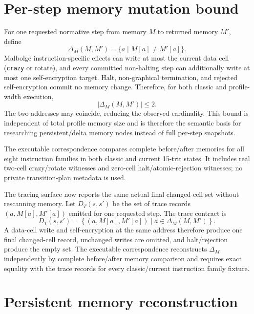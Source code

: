 \documentclass{article}
\begin{document}
\section{Per-step memory mutation bound}

For one requested normative step from memory $M$ to returned memory $M'$, define
\[
  \Delta_M(M,M')=\{a\mid M[a]\neq M'[a]\}.
\]
Malbolge instruction-specific effects can write at most the current data cell
(\texttt{crazy} or rotate), and every committed non-halting step can
additionally write
at most one self-encryption target. Halt, non-graphical termination, and
rejected
self-encryption commit no memory change. Therefore, for both classic and
profile-width execution,
\begin{equation}
  \left|\Delta_M(M,M')\right|\leq2.
  \label{eq:state-graph-two-cell-memory-delta}
\end{equation}
The two addresses may coincide, reducing the observed cardinality. This bound is
independent of total profile memory size and is therefore the semantic basis for
researching persistent/delta memory nodes instead of full per-step snapshots.

The executable correspondence compares complete before/after memories for all
eight instruction families in both classic and current 15-trit states. It
includes real two-cell crazy/rotate witnesses and zero-cell
halt/atomic-rejection
witnesses; no private transition-plan metadata is used.

The tracing surface now reports the same actual final changed-cell set without
rescanning memory. Let $D_T(s,s')$ be the set of trace records
$(a,M[a],M'[a])$ emitted for one requested step. The trace contract is
\begin{equation}
  D_T(s,s')
    = \left\{(a,M[a],M'[a])\mid a\in\Delta_M(M,M')\right\}.
  \label{eq:state-graph-trace-memory-delta}
\end{equation}
A data-cell write and self-encryption at the same address therefore produce one
final changed-cell record, unchanged writes are omitted, and halt/rejection
produce the empty set. The executable correspondence reconstructs
$\Delta_M$ independently by complete before/after memory comparison and requires
exact equality with the trace records for every classic/current instruction
family fixture.

\section{Persistent memory reconstruction}
\end{document}
